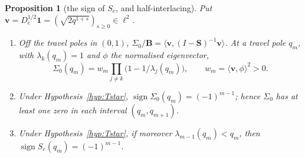 \documentclass[11pt]{article}
\theoremstyle{plain}
\newtheorem{proposition}[theorem]{Proposition}
\theoremstyle{definition}
\theoremstyle{remark}
\begin{document}
\begin{proposition}[the sign of $S_e$, and half-interlacing]\label{prop:signlaws}
Put $\mathbf v=D_e^{1/2}\mathbf 1=(\sqrt{2q^{1+s}})_{s\ge0}\in\ell^2$.
\begin{enumerate}[label=\textup{(\alph*)},leftmargin=2.2em,itemsep=0.1em,topsep=0.2em]
\item Off the travel poles in $(0,1)$,
$\Sigma_0/\mathbf B=\langle\mathbf v,(I-\mathbf S)^{-1}\mathbf v\rangle$. At a travel pole $q_m$, with
$\lambda_k(q_m)=1$ and $\phi$ the normalised eigenvector,
\[
   \Sigma_0(q_m)=w_m\prod_{j\ne k}\bigl(1-1/\lambda_j(q_m)\bigr),\qquad
   w_m=\langle\mathbf v,\phi\rangle^2>0 .
\]
\item Under Hypothesis~\ref{hyp:Tstar}, $\operatorname{sign}\Sigma_0(q_m)=(-1)^{m-1}$; hence
$\Sigma_0$ has at least one zero in each interval $(q_m,q_{m+1})$.
\item Under Hypothesis~\ref{hyp:Tstar}, if moreover $\lambda_{m-1}(q_m)<q_m$, then
$\operatorname{sign}S_e(q_m)=(-1)^{m-1}$.
\end{enumerate}
\end{proposition}
\end{document}
